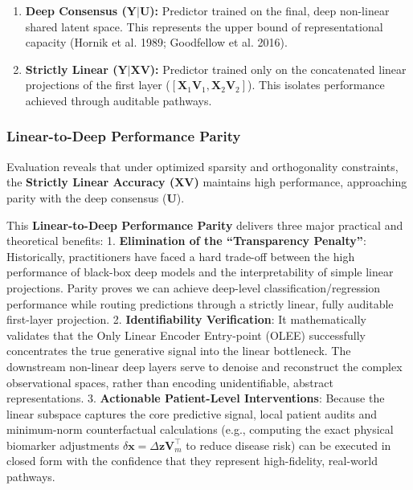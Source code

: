 \documentclass[
  letterpaper,
]{report}
\providecommand{\tightlist}{%
  \setlength{\itemsep}{0pt}\setlength{\parskip}{0pt}}
\begin{document}
\begin{enumerate}
\def\labelenumi{\arabic{enumi}.}
\tightlist
\item
  \textbf{Deep Consensus (\(\mathbf{Y}|\mathbf{U}\)):} Predictor trained
  on the final, deep non-linear shared latent space. This represents the
  upper bound of representational capacity (Hornik et al. 1989;
  Goodfellow et al. 2016).
\item
  \textbf{Strictly Linear (\(\mathbf{Y}|\mathbf{X}\mathbf{V}\)):}
  Predictor trained only on the concatenated linear projections of the
  first layer
  (\([\mathbf{X}_1 \mathbf{V}_1, \mathbf{X}_2 \mathbf{V}_2]\)). This
  isolates performance achieved through auditable pathways.
\end{enumerate}

\subsubsection{Linear-to-Deep Performance
Parity}\label{linear-to-deep-performance-parity}

Evaluation reveals that under optimized sparsity and orthogonality
constraints, the \textbf{Strictly Linear Accuracy
(\(\mathbf{X}\mathbf{V}\))} maintains high performance, approaching
parity with the deep consensus (\(\mathbf{U}\)).

This \textbf{Linear-to-Deep Performance Parity} delivers three major
practical and theoretical benefits: 1. \textbf{Elimination of the
``Transparency Penalty''}: Historically, practitioners have faced a hard
trade-off between the high performance of black-box deep models and the
interpretability of simple linear projections. Parity proves we can
achieve deep-level classification/regression performance while routing
predictions through a strictly linear, fully auditable first-layer
projection. 2. \textbf{Identifiability Verification}: It mathematically
validates that the Only Linear Encoder Entry-point (OLEE) successfully
concentrates the true generative signal into the linear bottleneck. The
downstream non-linear deep layers serve to denoise and reconstruct the
complex observational spaces, rather than encoding unidentifiable,
abstract representations. 3. \textbf{Actionable Patient-Level
Interventions}: Because the linear subspace captures the core predictive
signal, local patient audits and minimum-norm counterfactual
calculations (e.g., computing the exact physical biomarker adjustments
\(\delta \mathbf{x} = \Delta \mathbf{z} \mathbf{V}_m^\top\) to reduce
disease risk) can be executed in closed form with the confidence that
they represent high-fidelity, real-world pathways.
\end{document}
